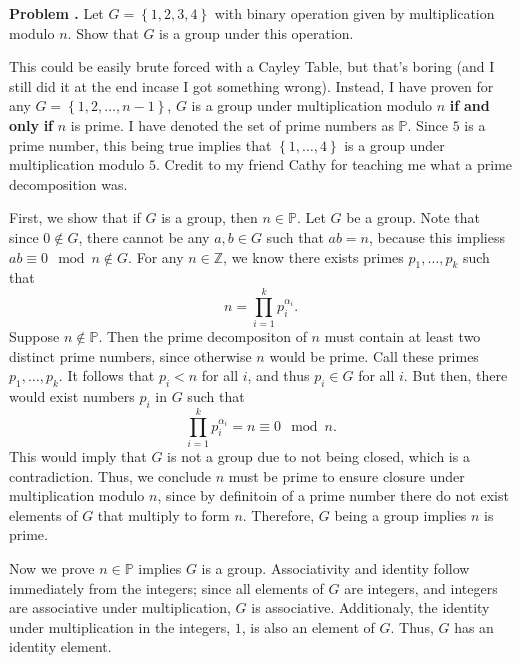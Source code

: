 \documentclass[11pt, letterpaper]{report}
\newcounter{prob}\setcounter{prob}{0}
\renewcommand{\theprob}{\textbf{Problem \arabic{prob}. }}
\newcommand{\problem}{\stepcounter{prob}\noindent\theprob}
\renewenvironment{solution}[1][]{\begin{bwaaa}}{\end{bwaaa}\vspace{10pt}}
\begin{document}
\problem Let $G=\left\{ 1,2,3,4 \right\} $ with binary operation given by multiplication modulo $n$. Show that $G$ is a group under this operation.
\begin{solution}
This could be easily brute forced with a Cayley Table, but that's boring (and I still did it at the end incase I got something wrong). Instead, I have proven for any $G=\left\{1,2,\ldots,n-1  \right\} $, $G$ is a group under multiplication modulo $n$ \textbf{if} \textbf{and} \textbf{only} \textbf{if} $n$ is prime. I have denoted the set of prime numbers as $\mathbb{P}$. Since $5$ is a prime number, this being true implies that $\left\{ 1,\ldots,4 \right\} $ is a group under multiplication modulo $5$. Credit to my friend Cathy for teaching me what a prime decomposition was.

First, we show that if $G$ is a group, then $n\in\mathbb{P}$. Let $G$ be a group. Note that since $0\notin G$, there cannot be any $a,b\in G$ such that $ab=n$, because this impliess $ab\equiv 0\mod n\notin G$. For any $n\in\mathbb{Z}$, we know there exists primes $p_1, \dots, p_k$ such that
\[
	n=\prod_{i=1}^k p_i^{\alpha_i}
.\]
Suppose $n\notin \mathbb{P}$. Then the prime decompositon of $n$ must contain at least two distinct prime numbers, since otherwise $n$ would be prime. Call these primes $p_1, \ldots,p_k$. It follows that $p_i < n$ for all $i$, and thus $p_i\in G$ for all $i$. But then, there would exist numbers $p_i$ in $G$ such that
\[
	\prod_{i=1}^k p_i^{\alpha _i} = n \equiv  0\mod n
.\]
This would imply that $G$ is not a group due to not being closed, which is a contradiction. Thus, we conclude $n$ must be prime to ensure closure under multiplication modulo $n$, since by definitoin of a prime number there do not exist elements of $G$ that multiply to form $n$. Therefore, $G$ being a group implies $n$ is prime.

Now we prove $n\in\mathbb{P}$ implies $G$ is a group. Associativity and identity follow immediately from the integers; since all elements of $G$ are integers, and integers are associative under multiplication, $G$ is associative. Additionaly, the identity under multiplication in the integers, $1$, is also an element of $G$. Thus, $G$ has an identity element.


\end{solution}
\end{document}
